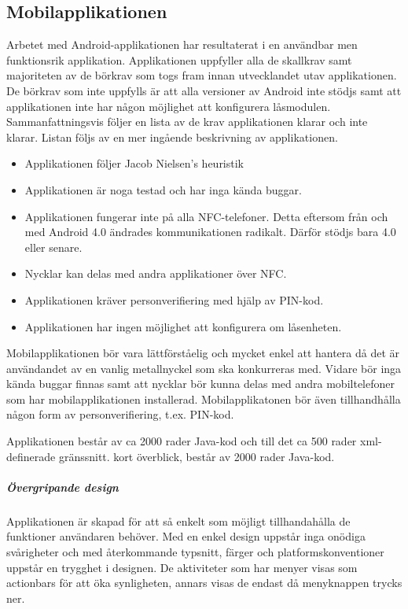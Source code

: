\documentclass[11pt]{article}
\begin{document}
\subsection{Mobilapplikationen}
Arbetet med Android-applikationen har resultaterat i en användbar men funktionsrik applikation. Applikationen uppfyller alla de skallkrav samt majoriteten av de börkrav som togs fram innan utvecklandet utav applikationen. De börkrav som inte uppfylls är att alla versioner av Android inte stödjs samt att applikationen inte har någon möjlighet att konfigurera låsmodulen. Sammanfattningsvis följer en lista av de krav applikationen klarar och inte klarar. Listan följs av en mer ingående beskrivning av applikationen.
\begin{itemize}
\item Applikationen följer Jacob Nielsen’s heuristik
\item Applikationen är noga testad och har inga kända buggar.
\item Applikationen fungerar inte på alla NFC-telefoner. Detta eftersom från och med Android 4.0 ändrades kommunikationen radikalt. Därför stödjs bara 4.0 eller senare.
\item Nycklar kan delas med andra applikationer över NFC.
\item Applikationen kräver personverifiering med hjälp av PIN-kod.
\item Applikationen har ingen möjlighet att konfigurera om låsenheten.
\end{itemize}

Mobilapplikationen bör vara lättförståelig och mycket enkel att hantera då det är användandet av en vanlig metallnyckel som ska konkurreras med. Vidare bör inga kända buggar finnas samt att nycklar bör kunna delas med andra mobiltelefoner som har mobilapplikationen installerad. Mobilapplikatonen bör även tillhandhålla någon form av personverifiering, t.ex. PIN-kod.

Applikationen består av ca 2000 rader Java-kod och till det ca 500 rader xml-definerade gränssnitt. 
kort överblick, består av 2000 rader Java-kod.

\subparagraph{Övergripande design}
Applikationen är skapad för att så enkelt som möjligt tillhandahålla de funktioner användaren behöver. Med en enkel design uppstår inga onödiga svårigheter och med återkommande typsnitt, färger och platformskonventioner uppstår en trygghet i designen. De aktiviteter som har menyer visas som actionbars för att öka synligheten, annars visas de endast då menyknappen trycks ner.
\end{document}
